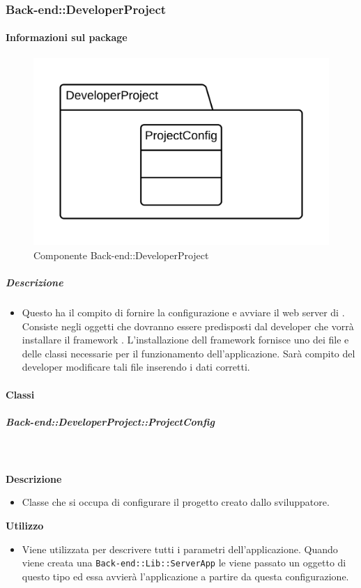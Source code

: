   \subsubsection{Back-end::DeveloperProject}
  \paragraph{Informazioni sul package} 
    \begin{figure}[H] 
      \begin{center} 
        \includegraphics[scale=0.16]{packages/Back-end::DeveloperProject.png}  
        \caption{Componente Back-end::DeveloperProject}
      \end{center}  
    \end{figure} 
  \subparagraph{Descrizione} 
    \begin{itemize}
    \item[] Questo  ha il compito di fornire la configurazione e avviare il web server di . Consiste negli oggetti che dovranno essere predisposti dal developer che vorrà installare il framework . L'installazione dell framework  fornisce uno  dei file e delle classi necessarie per il funzionamento dell'applicazione. Sarà compito del developer modificare tali file inserendo i dati corretti.
    \end{itemize} 
    \paragraph{Classi}
      \subparagraph{Back-end::DeveloperProject::ProjectConfig}
        
        \textbf{\\ \\ Descrizione} 
          \begin{itemize}
            \item[] Classe che si occupa di configurare il progetto creato dallo sviluppatore.
          \end{itemize}      
        \textbf{Utilizzo}  
          \begin{itemize}
            \item[] Viene utilizzata per descrivere tutti i parametri dell'applicazione. Quando viene creata una \texttt{Back-end::Lib::ServerApp} le viene passato un oggetto di questo tipo ed essa avvierà l'applicazione a partire da questa configurazione.
          \end{itemize}
